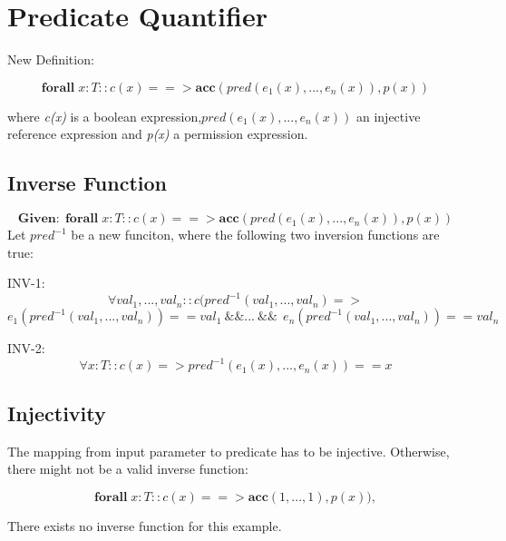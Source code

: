 \documentclass[12pt]{article}
\begin{document}
\maketitle

\section{Predicate Quantifier}
New Definition:

\begin{equation}
	\mathbf{forall} \; x:T :: c(x) ==>\mathbf{acc}( pred(e_1(x), ... ,e_n(x)), p(x) )
\end{equation}

where {\it c(x)} is  a boolean expression,$pred(e_1(x), ... ,e_n(x))$ an injective reference expression and {\it p(x)} a permission expression.

\subsection{Inverse Function}

\[ \mathbf{Given: \; } \mathbf{forall} \; x:T :: c(x) ==> \mathbf{acc}( pred(e_1(x), ... ,e_n(x)), p(x) )   \]
Let  $pred^{- 1}$ be a new funciton, where the following two inversion functions are true:

INV-1:
\[ \forall val_1, ..., val_n :: c(pred^{-1} (val_1, ..., val_n) => \]
\[ e_1 (pred^{-1} (val_1, ..., val_n)) == val_1 \: \&\&  ... \: \&\&  \:\: e_n(pred^{-1} (val_1, ..., val_n)) == val_n\]


INV-2:
\[ \forall x:T :: c(x) => pred^{-1}(e_1(x), ..., e_n(x)) == x\]

\subsection{Injectivity}
The mapping from input parameter to predicate has to be injective. Otherwise, there might not be a valid inverse function:


\begin{equation}
	\mathbf{forall} \; x:T :: c(x) ==> \mathbf{acc}( 1, ... ,1), p(x) ) ,
\end{equation}

There exists no inverse function for this example.

%
\end{document}
